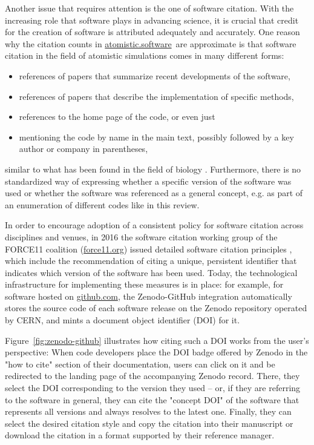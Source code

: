 \documentclass[9pt,review]{livecoms}
\newcommand{\atsoft}{\href{https://atomistic.software}{atomistic.software}\ }
\begin{document}
Another issue that requires attention is the one of software citation.
With the increasing role that software plays in advancing science, it is crucial that credit for the creation of software is attributed adequately and accurately.
One reason why the citation counts in \atsoft are approximate is that software citation in the field of atomistic simulations comes in many different forms: 
\begin{itemize}
    \item references of papers that summarize recent developments of the software,
    \item references of papers that describe the implementation of specific methods,
    \item references to the home page of the code, or even just
    \item mentioning the code by name in the main text, possibly followed by a key author or company in parentheses,
\end{itemize}
similar to what has been found in the field of biology \cite{Howison2016}.
Furthermore, there is no standardized way of expressing whether a specific version of the software was used or whether the software was referenced as a general concept, e.g. as part of an enumeration of different codes like in this review.

In order to encourage adoption of a consistent policy for software citation across disciplines and venues, in 2016 the software citation working group of the FORCE11 coalition (\url{force11.org}) issued detailed software citation principles \cite{Smith2016}, which include the recommendation of citing a unique, persistent identifier that indicates which version of the software has been used.
Today, the technological infrastructure for implementing these measures is in place:
for example, for software hosted on \url{github.com}, the Zenodo-GitHub integration \cite{zenodo-github-integration} automatically stores the source code of each software release on the Zenodo repository operated by CERN, and mints a document object identifier (DOI) for it.

Figure~\ref{fig:zenodo-github} illustrates how citing such a DOI works from the user's perspective:
When code developers place the DOI badge offered by Zenodo in the "how to cite" section of their documentation, users can click on it and be redirected to the landing page of the accompanying Zenodo record.
There, they select the DOI corresponding to the version they used -- or, if they are referring to the software in general, they can cite the "concept DOI" of the software that represents all versions and always resolves to the latest one.
Finally, they can select the desired citation style and copy the citation into their manuscript or download the citation in a format supported by their reference manager.
\end{document}
